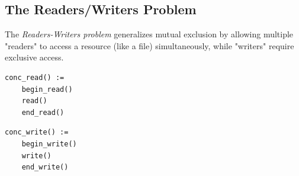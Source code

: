 \subsection{The Readers/Writers Problem}
The \textit{Readers-Writers problem} generalizes mutual exclusion by allowing multiple "readers" to access a resource (like a file) simultaneously, while "writers" require exclusive access. 

\begin{minipage}{\textwidth}
\begin{minipage}{0.45\textwidth}
\begin{lstlisting}[mathescape]
conc_read() :=
    begin_read()
    read()
    end_read()
\end{lstlisting}
\end{minipage}
\hfill
\begin{minipage}{0.45\textwidth}
\begin{lstlisting}[mathescape]
conc_write() :=
    begin_write()
    write()
    end_write()
\end{lstlisting}
\end{minipage}
\end{minipage}\\

